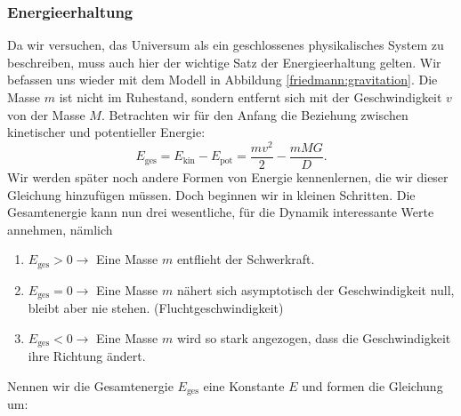 \begin{refsection}
\subsubsection{Energieerhaltung}
Da wir versuchen, das Universum als ein geschlossenes physikalisches System zu beschreiben, muss auch hier der wichtige Satz der Energieerhaltung gelten. Wir befassen uns wieder mit dem Modell in Abbildung \ref{friedmann:gravitation}. Die Masse $m$ ist nicht im Ruhestand, sondern entfernt sich mit der Geschwindigkeit $v$ von der Masse $M$. Betrachten wir für den Anfang die Beziehung zwischen kinetischer und potentieller Energie:
\begin{equation}
E_{\text{ges}} = E_{\text{kin}} - E_{\text{pot}} =  \frac{m v^2}{2} - \frac{m M G }{D}.
\end{equation}
Wir werden später noch andere Formen von Energie kennenlernen, die wir dieser Gleichung hinzufügen müssen. Doch beginnen wir in kleinen Schritten. Die Gesamtenergie kann nun drei wesentliche, für die Dynamik interessante Werte annehmen, nämlich
\begin{enumerate}
	\item $E_{\text{ges}} > 0 \rightarrow$ Eine Masse $m$ entflieht der Schwerkraft.
	\item $E_{\text{ges}} = 0 \rightarrow$ Eine Masse $m$ nähert sich asymptotisch  der Geschwindigkeit null, bleibt aber nie stehen. (Fluchtgeschwindigkeit)
	\item $E_{\text{ges}} < 0 \rightarrow$ Eine Masse $m$ wird so stark angezogen, dass die Geschwindigkeit ihre Richtung ändert.
\end{enumerate}
Nennen wir die Gesamtenergie $E_{\text{ges}}$ eine Konstante $E$ und formen die Gleichung um:


\end{refsection}
